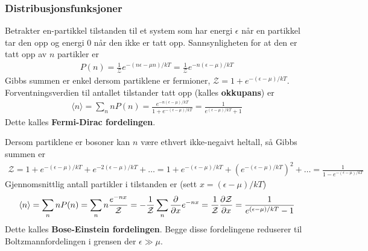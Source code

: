 \documentclass[12pt]{article}
\newcommand{\mean}[1]{\langle #1 \rangle}
\begin{document}
\subsubsection{Distribusjonsfunksjoner}
Betrakter en-partikkel tilstanden til et system som har energi $\epsilon$ når
en partikkel tar den opp og energi $0$ når den ikke er tatt opp. Sannsynligheten
for at den er tatt opp av $n$ partikler er
\begin{align*}
  P(n) = \frac{1}{\mathcal{Z}} e^{-(n\epsilon - \mu n)/kT} = \frac{1}{\mathcal{Z}} e^{-n(\epsilon - \mu)/kT}
\end{align*}
Gibbs summen er enkel dersom partiklene er fermioner, $\mathcal{Z} = 1 + e^{-(\epsilon - \mu)/kT}$.
Forventningsverdien til antallet tilstander tatt opp (kalles \textbf{okkupans}) er
\begin{align*}
  \mean{n} = \sum_n n P(n) = \frac{e^{-n(\epsilon - \mu)/kT}}{1 + e^{-(\epsilon - \mu)/kT}} = \frac{1}{e^{(\epsilon - \mu)/kT} + 1}
\end{align*}
Dette kalles \textbf{Fermi-Dirac fordelingen}.

Dersom partiklene er bosoner kan $n$ være ethvert ikke-negaivt heltall, så Gibbs summen er
\begin{align*}
  \mathcal{Z} = 1 + e^{-(\epsilon - \mu)/kT} + e^{-2(\epsilon - \mu)/kT} + \hdots = 1 + e^{-(\epsilon - \mu)/kT} + (e^{-(\epsilon - \mu)/kT})^2 + \hdots = \frac{1}{1-e^{-(\epsilon - \mu)/kT}}
\end{align*}
Gjennomsnittlig antall partikler i tilstanden er (sett $x = (\epsilon - \mu)/kT$)
\begin{align*}
  \mean{n} = \sum_n n P(n) = \sum_n n \frac{e^{-nx}}{\mathcal{Z}} = - \frac{1}{\mathcal{Z}} \sum_n \pdv{x} e^{-nx} = \frac{1}{\mathcal{Z}} \pdv{\mathcal{Z}}{x} = \frac{1}{e^{(\epsilon - \mu)/kT} - 1}
\end{align*}
Dette kalles \textbf{Bose-Einstein fordelingen}. Begge disse fordelingene reduserer til Boltzmannfordelingen
i grensen der $\epsilon \gg \mu$.
\end{document}
